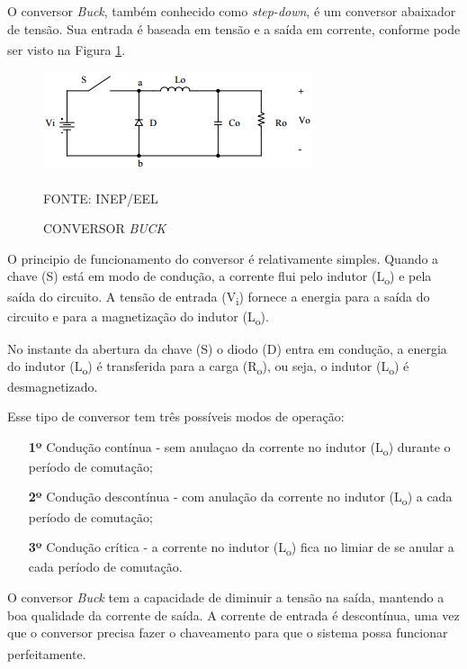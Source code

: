 \documentclass[
	12pt,				%
	openright,			%
	oneside,			%
	a4paper,			%
	english,			%
	french,				%
	spanish,			%
	brazil,				%
	oldfontcommands
	]{abntex2}
\begin{document}
	O conversor \textit{Buck}, também conhecido como \textit{step-down}, é um conversor abaixador de tensão. Sua entrada é baseada em tensão e a saída em corrente, conforme pode ser visto na Figura \ref{Fig_buck}.\textsuperscript{\cite{inep}}
	
 	\begin{figure}[th]
		\caption{CONVERSOR \textit{BUCK}}
		\label{Fig_buck}
		\centering
		\includegraphics[width=0.5\linewidth]{./figs/buck}
			
		\begin{small}
			FONTE: INEP/EEL\textsuperscript{\cite{inep}}
		\end{small}		
	\end{figure}

	O principio de funcionamento do conversor é relativamente simples. Quando a chave (S) está em modo de condução, a corrente flui pelo indutor (L\textsubscript{o}) e pela saída do circuito. A tensão de entrada (V\textsubscript{i}) fornece a energia para a saída do circuito e para a magnetização do indutor (L\textsubscript{o}).
	
	No instante da abertura da chave (S) o diodo (D) entra em condução, a energia do indutor (L\textsubscript{o}) é transferida para a carga (R\textsubscript{o}), ou seja, o indutor (L\textsubscript{o}) é desmagnetizado.
	
	Esse tipo de conversor tem três possíveis modos de operação:
	
	\begin{itemize} 
		\item[\textbf{1º}] Condução contínua - sem anulaçao da corrente no indutor (L\textsubscript{o}) durante o período de comutação;
		\item[\textbf{2º}] Condução descontínua - com anulação da corrente no indutor (L\textsubscript{o}) a cada período de comutação;
		\item[\textbf{3º}] Condução crítica - a corrente no indutor (L\textsubscript{o}) fica no limiar de se anular a cada período de comutação.
	\end{itemize}
	
	O conversor \textit{Buck} tem a capacidade de diminuir a tensão na saída, mantendo a boa qualidade da corrente de saída. A corrente de entrada é descontínua, uma vez que o conversor precisa fazer o chaveamento para que o sistema possa funcionar perfeitamente.\textsuperscript{\cite{inep}}
	
\end{document}
